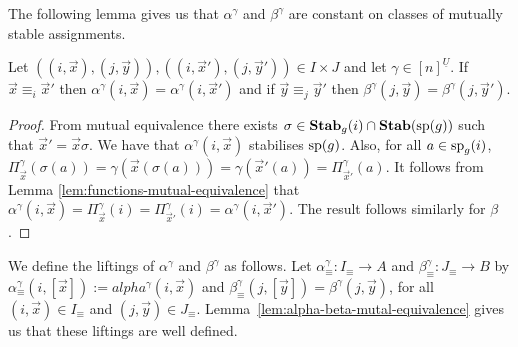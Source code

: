 \documentclass[../paper.tex]{subfiles}
\begin{document}

The following lemma gives us that $\alpha^{\gamma}$ and $\beta^{\gamma}$ are
constant on classes of mutually stable assignments.

\begin{lem}
	Let $((i, \vec{x}), (j, \vec{y})), ((i, \vec{x}'), (j, \vec{y}')) \in I \times
	J$ and let $\gamma \in [n]^{\underline{U}}$. If $\vec{x} \equiv_i \vec{x}'$
	then $\alpha^{\gamma}(i, \vec{x}) = \alpha^{\gamma}(i, \vec{x}')$ and if
	$\vec{y} \equiv_j \vec{y}'$ then $\beta^{\gamma}(j, \vec{y}) =
	\beta^{\gamma}(j, \vec{y}')$.
	\label{lem:alpha-beta-mutal-equivalence}
\end{lem}
\begin{proof}
	From mutual equivalence there exists $\sigma \in \text{\textbf{Stab}}_g(i) \cap \text{\textbf{Stab}} (\text{sp} (g))$
	such that $\vec{x}' = \vec{x} \sigma$. We have that $\alpha^{\gamma}(i,
	\vec{x})$ stabilises $\text{sp}(g)$. Also, for all $a \in \text{sp}_g(i)$,
	$\Pi^{\gamma}_{\vec{x}} (\sigma (a)) = \gamma (\vec{x}(\sigma (a))) = \gamma
	(\vec{x}'(a)) = \Pi^{\gamma}_{\vec{x}'}(a)$. It follows from Lemma
	\ref{lem:functions-mutual-equivalence} that $\alpha^{\gamma}(i,\vec{x}) =
	\Pi^{\gamma}_{\vec{x}} (i) = \Pi^{\gamma}_{\vec{x}'}(i) = \alpha^{\gamma}(i,
	\vec{x}')$. The result follows similarly for $\beta$.
\end{proof}

We define the liftings of $\alpha^{\gamma}$ and $\beta^{\gamma}$ as follows. Let
$\alpha^{\gamma}_{\equiv} : I_\equiv \rightarrow A$ and $\beta^{\gamma}_\equiv:
J_\equiv \rightarrow B$ by $\alpha^{\gamma}_{\equiv}(i, [\vec{x}]) :=
alpha^{\gamma} (i, \vec{x})$ and $\beta^{\gamma}_{\equiv}(j, [\vec{y}]) =
\beta^{\gamma} (j, \vec{y})$, for all $(i, \vec{x}) \in I_{\equiv}$ and $(j,
\vec{y}) \in J_\equiv$. Lemma~\ref{lem:alpha-beta-mutal-equivalence} gives us
that these liftings are well defined.

\end{document}
